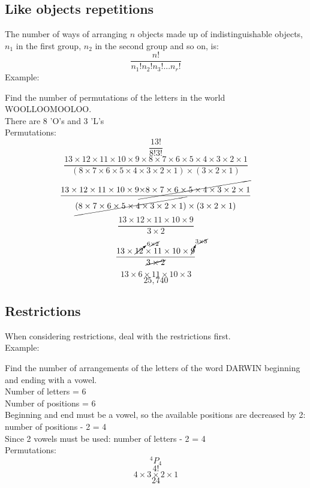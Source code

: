 \documentclass[a4paper,10pt]{report}
\begin{document}
\subsection{Like objects repetitions}
The number of ways of arranging $n$ objects made up of indistinguishable objects, $n_1$ in the first group, $n_2$ in the second group and so on, is:
$$
	\frac{n!}{n_1! n_2! n_3!... n_r!}
$$
Example:\\
\begin{center}
	Find the number of permutations of the letters in the world WOOLLOOMOOLOO.\\
	There are 8 'O's and 3 'L's\\
	Permutations:
	$$\frac{13!}{8!3!}$$
	$$\frac{13 \times 12 \times 11 \times 10 \times 9 \times 8 \times 7 \times 6 \times 5 \times 4 \times 3 \times 2 \times 1}{(8 \times 7 \times 6 \times 5 \times 4 \times 3 \times 2 \times 1) \times (3 \times 2 \times 1)}$$
	$$\frac{13 \times 12 \times 11 \times 10 \times 9 \cancel{\times 8 \times 7 \times 6 \times 5 \times 4 \times 3 \times 2 \times 1}}{\cancel{(8 \times 7 \times 6 \times 5 \times 4 \times 3 \times 2 \times 1)} \times (3 \times 2 \times 1)}$$
	$$\frac{13 \times 12 \times 11 \times 10 \times 9}{3 \times 2}$$
	$$\frac{13 \times \cancelto{6 \cancel{\times 2}}{12} \times 11 \times 10 \times \cancelto{3 \cancel{\times 3}}{9}}{\cancel{3 \times 2}}$$
	$$13 \times 6 \times 11 \times 10 \times 3$$
	$$25,740$$
\end{center}

\subsection{Restrictions}
When considering restrictions, deal with the restrictions first.\\
Example:\\
\begin{center}
	Find the number of arrangements of the letters of the word DARWIN beginning and ending with a vowel.\\
	Number of letters = 6\\
	Number of positions = 6\\
	Beginning and end must be a vowel, so the available positions are decreased by 2: number of positions - 2 = 4\\
	Since 2 vowels must be used:  number of letters - 2 = 4\\
	Permutations:
	$$^4P_4$$
	$$4!$$
	$$4 \times 3 \times 2 \times 1$$
	$$24$$
\end{center}
\end{document}
